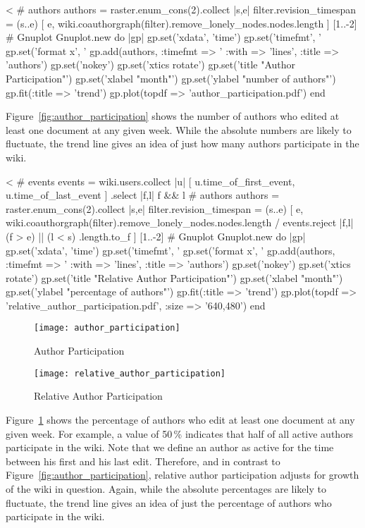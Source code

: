 \documentclass{scrartcl}
\begin{document}
<%
# authors
authors = raster.enum_cons(2).collect { |s,e| 
	filter.revision_timespan = (s..e)
	[ e, wiki.coauthorgraph(filter).remove_lonely_nodes.nodes.length ]
}[1..-2]
# Gnuplot
Gnuplot.new do |gp|
	gp.set('xdata', 'time')
	gp.set('timefmt', '%
	gp.set('format x', '%
	gp.add(authors, :timefmt => '%
		:with => 'lines',
		:title => 'authors')
	gp.set('nokey')
	gp.set('xtics rotate')
	gp.set('title "Author Participation"')
	gp.set('xlabel "month"')
	gp.set('ylabel "number of authors"')
	gp.fit(:title => 'trend')
	gp.plot(topdf => 'author_participation.pdf')
end

Figure~\ref{fig:author_participation} shows the number of authors who edited at least one document at any given week. While the absolute numbers are likely to fluctuate, the trend line gives an idea of just how many authors participate in the wiki.

<%
# events
events = wiki.users.collect{ |u| 
	[ u.time_of_first_event, u.time_of_last_event ] 
    }.select { |f,l| f && l }
# authors
authors = raster.enum_cons(2).collect { |s,e|
	filter.revision_timespan = (s..e)
	[ e,
    	wiki.coauthorgraph(filter).remove_lonely_nodes.nodes.length /
        events.reject { |f,l| (f > e) || (l < s) }.length.to_f ]
	}[1..-2]
# Gnuplot
Gnuplot.new do |gp|
	gp.set('xdata', 'time')
	gp.set('timefmt', '%
	gp.set('format x', '%
	gp.add(authors, :timefmt => '%
		:with => 'lines',
		:title => 'authors')
	gp.set('nokey')
	gp.set('xtics rotate')
	gp.set('title "Relative Author Participation"')
	gp.set('xlabel "month"')
	gp.set('ylabel "percentage of authors"')
	gp.fit(:title => 'trend')
	gp.plot(topdf => 'relative_author_participation.pdf', :size => '640,480')
end

\begin{figure}[htbp]
	\centering
	\texttt{[image: author\_participation]}
	\caption{Author Participation}
	\label{fig:author_participation}
        \vfill

	\texttt{[image: relative\_author\_participation]}
	\caption{Relative Author Participation}
	\label{fig:relative_author_participation}
\end{figure}

Figure~\ref{fig:relative_author_participation} shows the percentage of authors who edit at least one document at any given week. For example, a value of 50\,\% indicates that half of all active authors participate in the wiki. Note that we define an author as active for the time between his first and his last edit. Therefore, and in contrast to Figure~\ref{fig:author_participation}, relative author participation adjusts for growth of the wiki in question. Again, while the absolute percentages are likely to fluctuate, the trend line gives an idea of just the percentage of authors who participate in the wiki.
\end{document}
